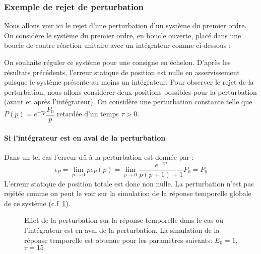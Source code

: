 \subsubsection{Exemple de rejet de perturbation}
Nous allons voir ici le rejet d'une perturbation d'un système du premier ordre. 
On considère le système du premier ordre, en boucle ouverte, placé dans une 
boucle de contre réaction unitaire avec un intégrateur comme ci-dessous :
\begin{center}                           
    
\end{center}                             
On souhaite réguler ce système pour une consigne en échelon.
D'après les résultats précédents, l'erreur statique de position est nulle 
en asservissement puisque le système présente au moins un intégrateur. 
Pour observer le rejet de la perturbation, nous allons considérer 
deux positions possibles pour la perturbation (avant et après 
l'intégrateur). On considère une perturbation constante telle 
que $P(p)=e^{-\tau p}\dfrac{P_0}{p}$ retardée d'un temps $\tau>0$. 
\paragraph{Si l'intégrateur est en aval de la perturbation}
Dans un tel cas l'erreur dû à la perturbation est donnée par :
\[
\epsilon_P=\lim\limits_{p\to0}p\epsilon_P(p)=
\lim\limits_{p\to0}\dfrac{e^{-\tau p}}{p(p+1)+1}P_0=P_0
\]
L'erreur statique de position totale est donc non nulle. La perturbation
n'est pas rejétée comme on peut le voir sur la simulation de la réponse
temporelle globale de ce système (c.f~\cref{fig-pert1}).
\begin{figure}[!h]
    \centering
    
    \caption{Effet de la perturbation sur la réponse temporelle dans le cas
             où l'intégrateur est en aval de la perturbation. La simulation 
             de la réponse temporelle est obtenue pour les paramètres suivants:
             $E_0=1$, $\tau=15$\label{fig-pert1}}
\end{figure}
